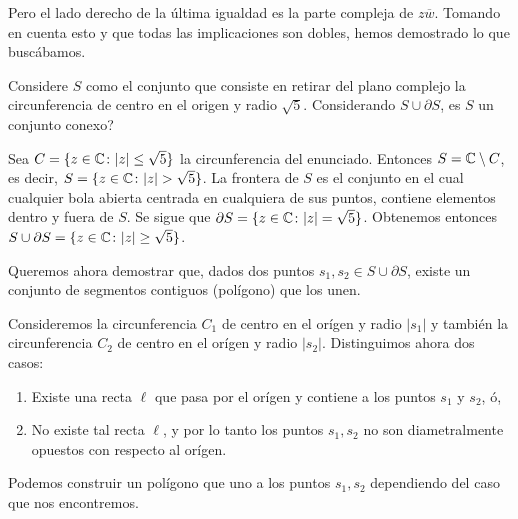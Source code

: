 \documentclass{scrartcl}
\begin{document}
Pero el lado derecho de la última igualdad es la parte compleja
de $z\overline{w}$. Tomando en cuenta esto y que todas las implicaciones son dobles,
hemos demostrado lo que buscábamos.

\exercise
Considere $S$ como el conjunto que consiste en retirar del
plano complejo la circunferencia de centro en el origen y radio $\sqrt5$.
Considerando $S ∪ ∂S$, es $S$ un conjunto conexo?

\solution
Sea $C = \{ z\in\mathbb{C}\colon |z| \leq \sqrt{5} \}$ la circunferencia del enunciado.
Entonces $S = \mathbb{C}\setminus C$, es decir, $S = \{ z\in\mathbb{C}\colon |z| > \sqrt{5} \}$.
La frontera de $S$ es el conjunto en el cual cualquier bola abierta centrada en cualquiera de
sus puntos, contiene elementos dentro y fuera de $S$.
Se sigue que $\partial S = \{z\in\mathbb{C}\colon |z| = \sqrt{5}\}$.
Obtenemos entonces $S\cup\partial S = \{ z\in\mathbb{C}\colon |z| \geq \sqrt{5} \}$.

Queremos ahora demostrar que, dados dos puntos $s_1,s_2\in S\cup\partial S$, existe un conjunto
de segmentos contiguos (polígono) que los unen.

Consideremos la circunferencia $C_1$ de centro en el orígen y radio $|s_1|$ y también la
circunferencia $C_2$ de centro en el orígen y radio $|s_2|$.
Distinguimos ahora dos casos:
\begin{enumerate}
    \item Existe una recta $\ell$ que pasa por el orígen y contiene a los puntos $s_1$ y $s_2$, ó,
    \item No existe tal recta $\ell$, y por lo tanto los puntos $s_1,s_2$ no son 
        diametralmente opuestos con respecto al orígen.
\end{enumerate}

Podemos construir un polígono que uno a los puntos $s_1,s_2$ dependiendo del caso que nos encontremos.
\end{document}
